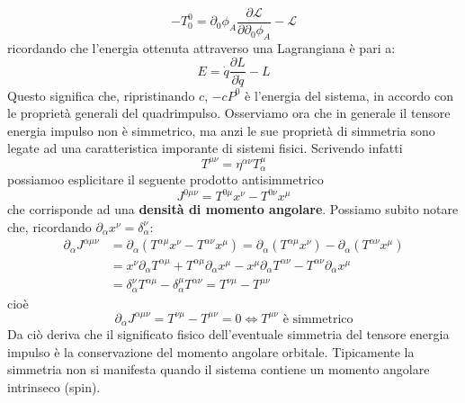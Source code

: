 \documentclass[a4paper,11pt]{book}
\theoremstyle{plain}
\theoremstyle{definition}
\begin{document}
\[
-T^0_0 = \partial_0\phi_A\frac{\partial\mathcal{L}}{\partial\partial_0\phi_A}-\mathcal{L}
\]
ricordando che l'energia ottenuta attraverso una Lagrangiana è pari a:
\[
E = \dot q \frac{\partial L}{\partial \dot q}-L
\]
Questo significa che, ripristinando $c$, $-cP^0$ è l'energia del sistema, in accordo con le proprietà generali del quadrimpulso. Osserviamo ora che in generale il tensore energia impulso non è simmetrico, ma anzi le sue proprietà di simmetria sono legate ad una caratteristica imporante di sistemi fisici. Scrivendo infatti
\[
T^{\mu\nu} = \eta^{\alpha\nu}T_{\alpha}^{\mu}
\]
possiamoo esplicitare il seguente prodotto antisimmetrico
\[
J^{0\mu\nu} = T^{0\mu}x^{\nu}-T^{0\nu}x^{\mu}
\]
che corrisponde ad una \textbf{densità di momento angolare}. Possiamo subito notare che, ricordando $\partial_{\alpha}x^{\nu} = \delta_{\alpha}^{\nu}$:
\begin{align*}
\partial_{\alpha}J^{\alpha\mu\nu} &= \partial_{\alpha}(T^{\alpha\mu}x^{\nu}-T^{\alpha\nu}x^{\mu}) = \partial_{\alpha}(T^{\alpha\mu}x^{\nu})-\partial_{\alpha}(T^{\alpha\nu}x^{\mu}) \\
&= x^{\nu}\partial_{\alpha}T^{\alpha\mu}+T^{\alpha\mu}\partial_{\alpha}x^{\mu} -x^{\mu}\partial_{\alpha}T^{\alpha\nu}-T^{\alpha\nu}\partial_{\alpha}x^{\mu} \\
&= \delta_{\alpha}^{\nu}T^{\alpha\mu} - \delta_{\alpha}^{\mu}T^{\alpha\nu} = T^{\nu\mu}-T^{\mu\nu}
\end{align*}
cioè
\[
\partial_{\alpha}J^{\alpha\mu\nu}= T^{\nu\mu}-T^{\mu\nu} = 0 \Longleftrightarrow T^{\mu\nu} \text{ è simmetrico}
\]
Da ciò deriva che il significato fisico dell'eventuale simmetria del tensore energia impulso è la conservazione del momento angolare orbitale. Tipicamente la simmetria non si manifesta quando il sistema contiene un momento angolare intrinseco (spin). 
\end{document}

